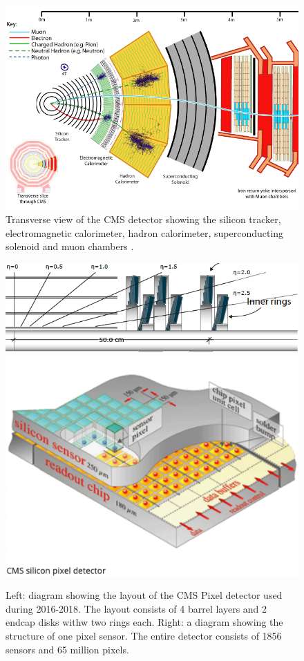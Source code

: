 \documentclass[final,12p]{article}
\begin{document}
\begin{figure}[H]
  \centering
  \includegraphics[width=0.7\columnwidth]{./cms12.png}
  \caption{Transverse view of the CMS detector showing the silicon tracker, electromagnetic calorimeter, hadron calorimeter, superconducting solenoid and muon chambers \cite{Chatrchyan:2008aa}.}
  \label{fig:CMS}
\end{figure}

\begin{figure}[H]
  \centering
  \includegraphics[width=0.7\columnwidth]{./PixelDetectorPhase1.png}
  \includegraphics[width=0.27\columnwidth]{./PixelSensor.png}
  \caption{
    Left: diagram showing the layout of the CMS Pixel detector used during 2016-2018.
    The layout consists of 4 barrel layers and 2 endcap disks withw two rings each.
    Right: a diagram showing the structure of one pixel sensor.
    The entire detector consists of 1856 sensors and 65 million pixels.
  }
  \label{fig:pixeldet}
\end{figure}
\end{document}
